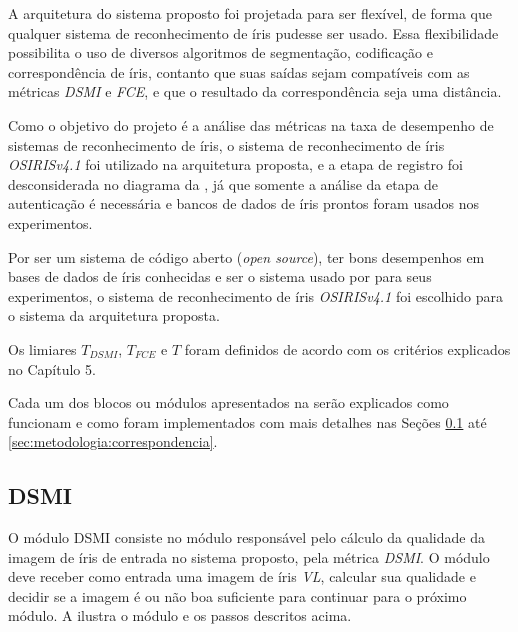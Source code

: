 \par A arquitetura do sistema proposto foi projetada para ser flexível, de forma que qualquer sistema de reconhecimento de íris pudesse ser usado. Essa flexibilidade possibilita o uso de diversos algoritmos de segmentação, codificação e correspondência de íris, contanto que suas saídas sejam compatíveis com as métricas \textit{\acrshort{DSMI}} e \textit{\acrshort{FCE}}, e que o resultado da correspondência seja uma distância.

\par Como o objetivo do projeto é a análise das métricas na taxa de desempenho de sistemas de reconhecimento de íris, o sistema de reconhecimento de íris \textit{OSIRISv4.1} \cite{othman2015, osirisv41} foi utilizado na arquitetura proposta, e a etapa de registro foi desconsiderada no diagrama da , já que somente a análise da etapa de autenticação é necessária e bancos de dados de íris prontos foram usados nos experimentos.

\par Por ser um sistema de código aberto (\textit{open source}), ter bons desempenhos em bases de dados de íris conhecidas e ser o sistema usado por \cite{Jenadeleh_2018_CVPR_Workshops} para seus experimentos, o sistema de reconhecimento de íris \textit{OSIRISv4.1} foi escolhido para o sistema da arquitetura proposta.

\par Os limiares $T_{DSMI}$, $T_{FCE}$ e $T$ foram definidos de acordo com os critérios explicados no Capítulo 5.

\par Cada um dos blocos ou módulos apresentados na  serão explicados como funcionam e como foram implementados com mais detalhes nas Seções \ref{sec:metodologia:dsmi} até \ref{sec:metodologia:correspondencia}.

\subsection{DSMI}\label{sec:metodologia:dsmi}

\par O módulo \acrshort{DSMI} consiste no módulo responsável pelo cálculo da qualidade da imagem de íris de entrada no sistema proposto, pela métrica \textit{\acrshort{DSMI}}. O módulo deve receber como entrada uma imagem de íris \textit{\acrshort{VL}}, calcular sua qualidade e decidir se a imagem é ou não boa suficiente para continuar para o próximo módulo. A  ilustra o módulo e os passos descritos acima.

